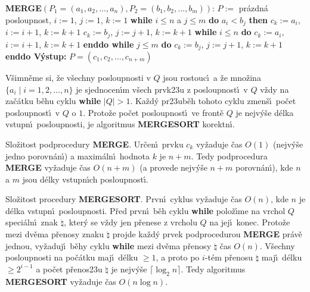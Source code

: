 {\bf MERGE$(P_1=(a_1,a_2,\dots,a_n),P_2=(b_1,b_2,\dots,b_m))$}:\newline 
$P:=$ pr\'azdn\'a posloupnost, $i:=1$, $j:=1$, $k:=1$\newline 
{\bf while} $i\le n$ a $j\le m$ {\bf do}\newline 
\phantom{---}{\bf if} $a_i<b_j$ {\bf then}\newline 
\phantom{------}$c_k:=a_i$, $i:=i+1$, $k:=k+1$\newline 
\phantom{---}{\bf else}\newline 
\phantom{------}$c_k:=b_j$, $j:=j+1$, $k:=k+1$\newline 
\phantom{---}{\bf endif\newline 
enddo}\newline 
{\bf while} $i\le n$ {\bf do}\newline 
\phantom{---}$c_k:=a_i$, $i:=i+1$, $k:=k+1$\newline 
{\bf enddo\newline 
while} $j\le m$ {\bf do}\newline 
\phantom{---}$c_k:=b_j$, $j:=j+1$, $k:=k+1$\newline 
{\bf enddo\newline 
V\'ystup:} $P=(c_1,c_2,\dots,c_{n+m})$
\bigskip

\flushpar V\v simn\v eme si, \v ze v\v sechny posloupnosti v $Q$ jsou 
rostouc\'\i\ a \v ze mno\v zina $\{a_i\mid i=1,2,\dots,n\}$ je sjednocen\'\i m 
v\v sech prvk\accent23u z posloupnost\'\i\ v $Q$ v\v zdy na za\v c\'atku 
b\v ehu cyklu {\bf while} $|Q|>1$. Ka\v zd\'y pr\accent23ub\v eh tohoto 
cyklu zmen\v s\'\i\ po\v cet posloupnost\'\i\ v $Q$ o $1$. Proto\v ze po\v cet 
posloupnost\'\i\ ve front\v e $Q$ je nejv\'y\v se d\'elka vstupn\'\i\ 
posloupnosti, je algoritmus 
{\bf MERGE\-SORT} korektn\'\i .
\medskip

\flushpar Slo\v zitost podprocedury {\bf MERGE}. Ur\v cen\'\i\ prvku $c_k$ 
vy\v za\-du\-je \v cas $O(1)$ (nejv\'y\v se jedno porovn\'an\'\i ) a 
maxim\'aln\'\i\ hodnota $k$ je $n+m$. Tedy 
podprocedura {\bf MERGE} vy\v zaduje \v cas $O(n+m)$ (a provede 
nejv\'y\v se $n+m$ 
porovn\'an\'\i ), kde $n$ a $m$ jsou d\'elky vstupn\'\i ch posloupnost\'\i .
\medskip

\flushpar Slo\v zitost procedury {\bf MERGESORT}. 
Prvn\'\i\ cyklus vy\v zaduje \v cas $O(n)$, kde $n$ je d\'elka vstupn\'\i\ posloupnosti. 
P\v red prvn\'\i\ b\v eh cyklu {\bf while} polo\v z\'\i me na vrchol $Q$ speci\'aln\'\i\ 
znak $\natural$, kter\'y se v\v zdy jen 
p\v renese z vrcholu $Q$ na jej\'\i\ konec. Proto\v ze mezi dv\v ema 
p\v renosy znaku $\natural$ projde ka\v zd\'y prvek 
podprocedurou {\bf MERGE} pr\'av\v e jednou, vy\v zaduj\'\i\ b\v ehy cyklu 
{\bf while} mezi dv\v ema p\v renosy $\natural$ \v cas $
O(n)$. V\v sech\-ny posloupnosti 
na po\v c\'atku maj\'\i\ d\'elku $\ge 1$, a proto po $i$-t\'em p\v renosu 
$\natural$ maj\'\i\ d\'elku $\ge 2^{i-1}$ a po\v cet p\v renos\accent23u 
$\natural$ je 
nejv\'y\v se $\lceil\log_2n\rceil$. Tedy algoritmus {\bf MERGESORT }
vy\v zaduje \v cas $O(n\log n)$.
\medskip

